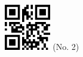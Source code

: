\documentclass[twocolumn]{article}
\title{}
\date{}
\begin{document}

\begin{center}
 \hspace{0.2cm}
 \includegraphics[width=2cm]{qrcode-2.png}
 \hspace{0.5cm}
 \Large{  (No. 2) }
\end{center}


\end{document}
